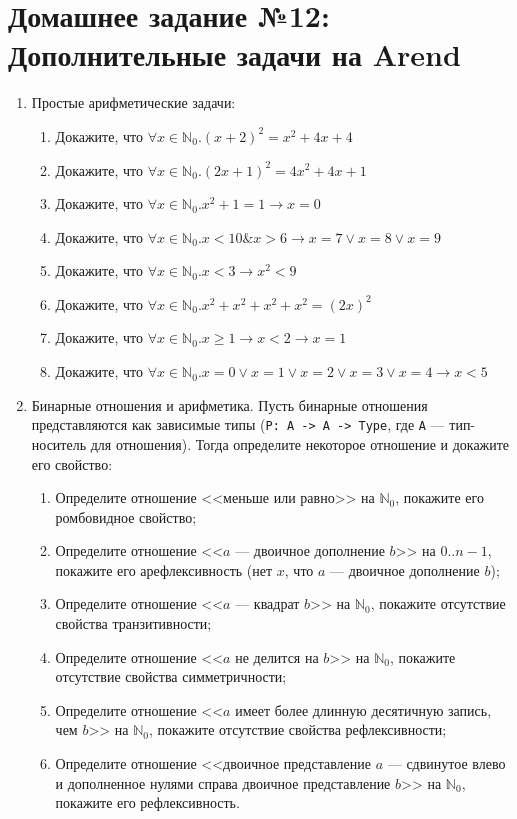\documentclass[10pt,a4paper,oneside]{article}
\begin{document}
\section*{Домашнее задание №12: Дополнительные задачи на Arend}
\begin{enumerate}
\item Простые арифметические задачи:
\begin{enumerate}
\item Докажите, что $\forall x\in\mathbb{N}_0.(x+2)^2 = x^2 + 4x + 4$
\item Докажите, что $\forall x\in\mathbb{N}_0.(2x+1)^2 = 4x^2 + 4x + 1$
\item Докажите, что $\forall x\in\mathbb{N}_0.x^2 + 1 = 1 \rightarrow x = 0$
\item Докажите, что $\forall x\in\mathbb{N}_0.x < 10 \& x > 6 \rightarrow x = 7 \vee x=8 \vee x=9$
\item Докажите, что $\forall x\in\mathbb{N}_0.x < 3 \rightarrow x^2 < 9$
\item Докажите, что $\forall x\in\mathbb{N}_0.x^2 + x^2 + x^2 + x^2 = (2x)^2$
\item Докажите, что $\forall x\in\mathbb{N}_0.x \ge 1 \rightarrow x < 2 \rightarrow x = 1$
\item Докажите, что $\forall x\in\mathbb{N}_0.x = 0 \vee x = 1 \vee x = 2 \vee x=3 \vee x=4 \rightarrow x < 5$
\end{enumerate}

\item Бинарные отношения и арифметика. Пусть бинарные отношения представляются как зависимые типы (\verb!P: A -> A -> Type!,
где \verb!A! --- тип-носитель для отношения).
Тогда определите некоторое отношение и докажите его свойство:
\begin{enumerate}
\item Определите отношение <<меньше или равно>> на $\mathbb{N}_0$, покажите его ромбовидное свойство;
\item Определите отношение <<$a$ --- двоичное дополнение $b$>> на $0..n-1$, покажите его арефлексивность (нет $x$, что $a$ ---
двоичное дополнение $b$);
\item Определите отношение <<$a$ --- квадрат $b$>> на $\mathbb{N}_0$, покажите отсутствие свойства транзитивности;
\item Определите отношение <<$a$ не делится на $b$>> на $\mathbb{N}_0$, покажите отсутствие свойства симметричности;
\item Определите отношение <<$a$ имеет более длинную десятичную запись, чем $b$>> на $\mathbb{N}_0$, покажите отсутствие свойства рефлексивности;
\item Определите отношение <<двоичное представление $a$ --- сдвинутое влево и дополненное нулями справа двоичное представление $b$>> 
на $\mathbb{N}_0$, покажите его рефлексивность.
\end{enumerate}


\end{enumerate}
\end{document}
